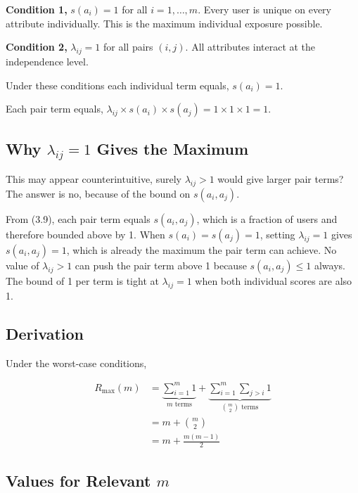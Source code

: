 \textbf{Condition 1,} $s(a_i) = 1$ for all $i = 1,
\ldots, m$. Every user is unique on every attribute
individually. This is the maximum individual exposure
possible.

\textbf{Condition 2,} $\lambda_{ij} = 1$ for all pairs
$(i, j)$. All attributes interact at the independence
level.

Under these conditions each individual term equals,
$s(a_i) = 1$.

Each pair term equals,
$\lambda_{ij} \times s(a_i) \times s(a_j)
= 1 \times 1 \times 1 = 1$.

\subsection{Why $\lambda_{ij} = 1$ Gives the Maximum}

This may appear counterintuitive, surely $\lambda_{ij}
> 1$ would give larger pair terms? The answer is no,
because of the bound on $s(a_i, a_j)$.

From (3.9), each pair term equals
$s(a_i, a_j)$, which is a fraction of users and
therefore bounded above by 1. When $s(a_i) = s(a_j) = 1$,
setting $\lambda_{ij} = 1$ gives $s(a_i, a_j) = 1$,
which is already the maximum the pair term can achieve.
No value of $\lambda_{ij} > 1$ can push the pair term
above 1 because $s(a_i, a_j) \leq 1$ always. The
bound of 1 per term is tight at $\lambda_{ij} = 1$
when both individual scores are also 1.

\subsection{Derivation}

Under the worst-case conditions,

\begin{align}
R_{\mathrm{max}}(m)
&= \underbrace{\sum_{i=1}^{m} 1}_{m \text{ terms}}
+ \underbrace{\sum_{i=1}^{m} \sum_{j > i} 1}_{\binom{m}{2}
\text{ terms}} \nonumber \\[6pt]
&= m + \binom{m}{2} \nonumber \\[6pt]
&= m + \frac{m(m-1)}{2}
\label{eq:r_max}
\end{align}

\subsection{Values for Relevant $m$}


